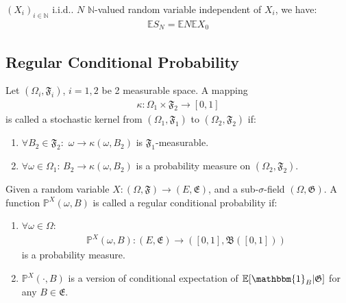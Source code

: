 \begin{example}
$(X_i)_{i \in \mathbb{N}}$ i.i.d.. $N$ $\mathbb{N}$-valued random variable independent of $X_i$, we have:
\begin{align*}
	\mathbb{E}S_N = \mathbb{E}N \mathbb{E}X_0
\end{align*}
\end{example}



\subsection{Regular Conditional Probability}
\begin{definition}
	Let $(\Omega_i, \mathfrak{F}_i)$, $i = 1, 2$ be 2 measurable space. A mapping
	\begin{align*}
		\kappa: \Omega_1 \times \mathfrak{F}_2 \rightarrow [0, 1] 
	\end{align*}
	is called a stochastic kernel from $(\Omega_1, \mathfrak{F}_1)$ to $(\Omega_2, \mathfrak{F}_2)$ if:
	\begin{enumerate}
		\item $\forall B_2 \in \mathfrak{F}_2: $ $\omega \rightarrow \kappa(\omega, B_2)$ is $\mathfrak{F}_1$-measurable.
		\item $\forall \omega \in \Omega_1$: $B_2 \rightarrow \kappa(\omega, B_2)$ is a probability measure on $(\Omega_2, \mathfrak{F}_2)$.
	\end{enumerate}
\end{definition}

\begin{definition}
Given a random variable $X: (\Omega, \mathfrak{F}) \rightarrow (E, \mathfrak{E})$, and a sub-$\sigma$-field $(\Omega, \mathfrak{G})$. A function $\mathbb{P}^X(\omega, B)$ is called a regular conditional probability if:
\begin{enumerate}
	\item $\forall \omega \in \Omega$: 
	\begin{align*}
		\mathbb{P}^X(\omega, B):  (E, \mathfrak{E}) \rightarrow ([0, 1], \mathfrak{B}([0, 1]))
	\end{align*}  is a probability measure.
	\item $\mathbb{P}^X(\cdot, B)$ is a version of conditional expectation of $\mathbb{E}[\mathbbm{1}_{B}|\mathfrak{G}]$ for any $B \in \mathfrak{E }$.
\end{enumerate}
\end{definition}

